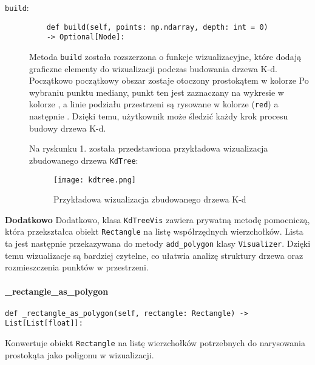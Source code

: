 \documentclass[12pt]{article}
\begin{document}
\begin{description}
    \item[\texttt{build}:] 
    \begin{verbatim}
    def build(self, points: np.ndarray, depth: int = 0) 
    -> Optional[Node]:
    \end{verbatim} 
    Metoda \texttt{build} została rozszerzona o funkcje wizualizacyjne, które dodają graficzne elementy do wizualizacji podczas budowania drzewa K-d. Początkowo początkowy obszar zostaje otoczony prostokątem w kolorze {} Po wybraniu punktu mediany, punkt ten jest zaznaczany na wykresie w kolorze {}, a linie podziału przestrzeni są rysowane w kolorze {\color{red}{czerwonym} (\texttt{red})} a następnie {}. Dzięki temu, użytkownik może śledzić każdy krok procesu budowy drzewa K-d.
    
\noindent Na ryskunku 1. została przedstawiona przykładowa wizualizacja zbudowanego drzewa \texttt{KdTree}:

\begin{figure}[h]
    \centering
    \texttt{[image: kdtree.png]}
    \caption{Przykładowa wizualizacja zbudowanego drzewa K-d}
    \label{fig:kdvisualization}
\end{figure}
\end{description}

\pagebreak
\textbf{Dodatkowo}
\noindent Dodatkowo, klasa \texttt{KdTreeVis} zawiera prywatną metodę pomocniczą, która przekształca obiekt \texttt{Rectangle} na listę współrzędnych wierzchołków. Lista ta jest następnie przekazywana do metody \texttt{add\_polygon} klasy \texttt{Visualizer}. Dzięki temu wizualizacje są bardziej czytelne, co ułatwia analizę struktury drzewa oraz rozmieszczenia punktów w przestrzeni.
 

\paragraph{\_rectangle\_as\_polygon}

\begin{verbatim}
def _rectangle_as_polygon(self, rectangle: Rectangle) -> List[List[float]]:
\end{verbatim}

\noindent Konwertuje obiekt \texttt{Rectangle} na listę wierzchołków potrzebnych do narysowania prostokąta jako poligonu w wizualizacji.
\end{document}
